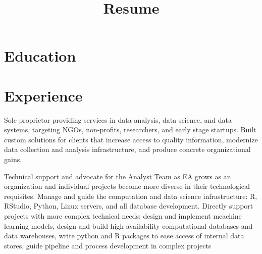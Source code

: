 \documentclass[10pt,letterpaper,colorlinks]{moderncv}
\title{Resume}
\begin{document}
\hypersetup{urlcolor=blue}
\makecvtitle
\section{Education}

\section{Experience}

{Sole proprietor providing services in data analysis, data science, and data systems, targeting NGOs, non-profits, researchers, and early stage startups. Built custom solutions for clients that increase access to quality information, modernize data collection and analysis infrastructure, and produce concrete organizational gains. }

{Technical support and advocate for the Analyst Team as EA grows as an organization and individual projects become more diverse in their technological requisites. Manage and guide the computation and data science infrastructure: R, RStudio, Python, Linux servers, and all database development. Directly support projects with more complex technical needs:  design and implement meachine learning models, design and build high availability computational databases and data warehouses, write python and R packages to ease access of internal data stores, guide pipeline and process development in complex projects}
\end{document}
